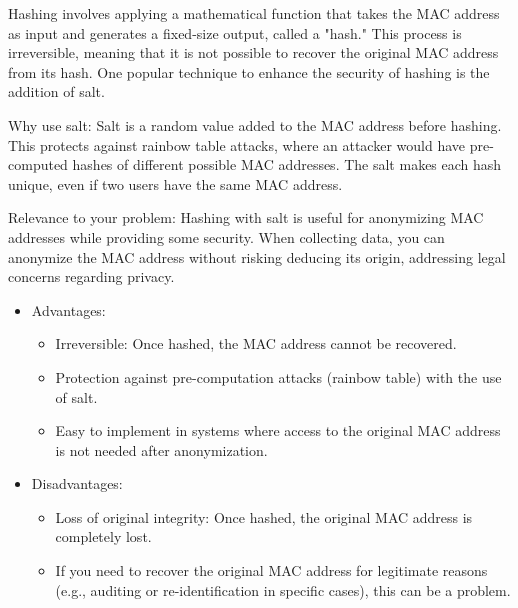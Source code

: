 \documentclass[aps,prb,twocolumn,superscriptaddress,floatfix,longbibliography,nofootinbib]{revtex4-2}
\begin{document}


  Hashing involves applying a mathematical function that takes the MAC address as input 
  and generates a fixed-size output, called a "hash." This process is irreversible,
  meaning that it is not possible to recover the original MAC address from its hash.
  One popular technique to enhance the security of hashing is the addition of salt.

  Why use salt: Salt is a random value added to the MAC address before hashing.
  This protects against rainbow table attacks, where an attacker would have pre-computed
  hashes of different possible MAC addresses. 
  The salt makes each hash unique, even if two users have the same MAC address.

  Relevance to your problem: Hashing with salt is useful for anonymizing MAC addresses
  while providing some security. When collecting data, you can anonymize the MAC address
  without risking deducing its origin, addressing legal concerns regarding privacy.

  \begin{itemize}
    \item Advantages:
      \begin{itemize}
      \item Irreversible: Once hashed, the MAC address cannot be recovered.
      \item Protection against pre-computation attacks (rainbow table) with the use of salt.
      \item Easy to implement in systems where access to the original MAC address is not 
      needed after anonymization.

      \end{itemize}
    \item Disadvantages:
      \begin{itemize}
      \item Loss of original integrity: Once hashed, the original MAC address is completely lost.
      \item If you need to recover the original MAC address for legitimate reasons 
      (e.g., auditing or re-identification in specific cases), this can be a problem.
      \end{itemize}
  \end{itemize}
\end{document}
